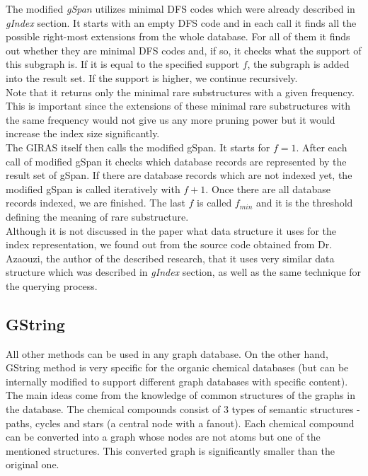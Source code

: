 The modified \textit{gSpan} utilizes minimal DFS codes which were already described in \textit{gIndex} section. It starts with an empty DFS code and in each call it finds all the possible right-most extensions from the whole database. For all of them it finds out whether they are minimal DFS codes and, if so, it checks what the support of this subgraph is. If it is equal to the specified support $f$, the subgraph is added into the result set. If the support is higher, we continue recursively.\\

Note that it returns only the minimal rare substructures with a given frequency. This is important since the extensions of these minimal rare substructures with the same frequency would not give us any more pruning power but it would increase the index size significantly.\\

The GIRAS itself then calls the modified gSpan. It starts for $f=1$. After each call of modified gSpan it checks which database records are represented by the result set of gSpan. If there are database records which are not indexed yet, the modified gSpan is called iteratively with $f+1$. Once there are all database records indexed, we are finished. The last $f$ is called $f_{min}$ and it is the threshold defining the meaning of rare substructure.\\

Although it is not discussed in the paper \cite{GIRAS} what data structure it uses for the index representation, we found out from the source code obtained from Dr. Azaouzi, the author of the described research, that it uses very similar data structure which was described in \textit{gIndex} section, as well as the same technique for the querying process.

\subsection{GString}

All other methods can be used in any graph database. On the other hand, GString method is very specific for the organic chemical databases (but can be internally modified to support different graph databases with specific content).\\

The main ideas come from the knowledge of common structures of the graphs in the database. The chemical compounds consist of 3 types of semantic structures - paths, cycles and stars (a central node with a fanout). Each chemical compound can be converted into a graph whose nodes are not atoms but one of the mentioned structures. This converted graph is significantly smaller than the original one.\\

